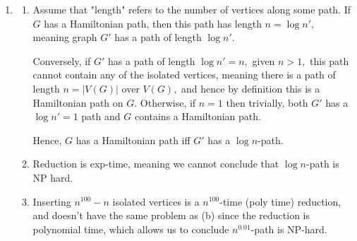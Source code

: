 \documentclass[12pt]{article}
\begin{document}
\begin{enumerate}
    Additionally, $5$-coloring is in NP since we can verify whether
    an instance is a valid coloring in $\mathcal O(|E|)$ time by
    checking all edges and verifying that any two adjacent vertices
    have different colors.

    Thus, $5$-coloring is NP-complete.

  \item
    \begin{enumerate}
      \item Assume that "length" refers to the number of vertices
        along some path. If $G$ has a Hamiltonian path, then this
        path has length $n = \log n',$  meaning graph $G'$ has a path
        of length $\log n'.$

        Conversely, if $G'$ has a path of length $\log n' = n,$ given
        $n > 1,$ this path cannot contain any of the isolated
        vertices, meaning there is a path of length $n = |V(G)|$ over
        $V(G),$ and hence by definition this is a Hamiltonian path on
        $G.$ Otherwise, if $n = 1$ then trivially, both $G'$ has a
        $\log n' = 1$ path and $G$ contains a Hamiltonian path.

        Hence, $G$ has a Hamiltonian path iff $G'$ has a $\log n$-path.

      \item Reduction is exp-time, meaning we cannot conclude that
        $\log n$-path is NP hard.

      \item Inserting $n^{100} - n$ isolated vertices is a
        $n^{100}$-time (poly time) reduction, and doesn't have the
        same problem as (b) since the reduction is polynomial time,
        which allows us to conclude $n^{0.01}$-path is NP-hard.
    \end{enumerate}
\end{enumerate}
\end{document}
